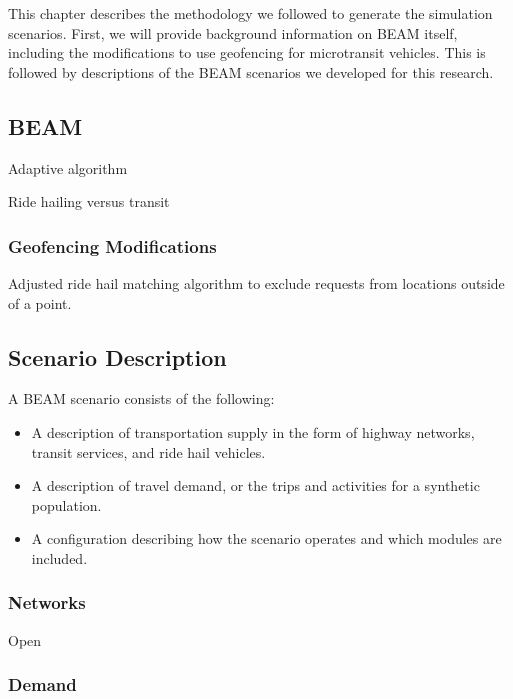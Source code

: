 \documentclass[
]{article}
\providecommand{\tightlist}{%
  \setlength{\itemsep}{0pt}\setlength{\parskip}{0pt}}
\begin{document}
This chapter describes the methodology we followed to generate the simulation scenarios. First, we will provide background information on BEAM itself, including the modifications to use geofencing for microtransit vehicles. This is followed by descriptions of the BEAM scenarios we developed for this research.

\hypertarget{beam}{%
\subsection{BEAM}\label{beam}}

Adaptive algorithm

Ride hailing versus transit

\hypertarget{geofencing-modifications}{%
\subsubsection{Geofencing Modifications}\label{geofencing-modifications}}

Adjusted ride hail matching algorithm to exclude requests from locations outside of a point.

\hypertarget{scenario-description}{%
\subsection{Scenario Description}\label{scenario-description}}

A BEAM scenario consists of the following:

\begin{itemize}
\tightlist
\item
  A description of transportation supply in the form of highway networks, transit services, and ride hail vehicles.
\item
  A description of travel demand, or the trips and activities for a synthetic population.
\item
  A configuration describing how the scenario operates and which modules are included.
\end{itemize}

\hypertarget{networks}{%
\subsubsection{Networks}\label{networks}}

Open

\hypertarget{demand}{%
\subsubsection{Demand}\label{demand}}
\end{document}
